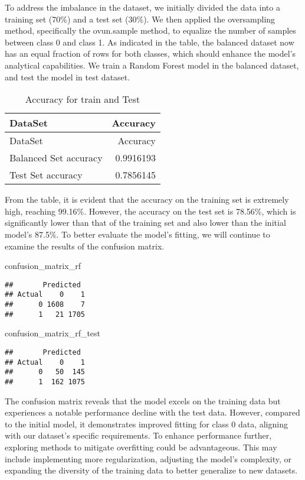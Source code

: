 \documentclass[
]{article}
\newenvironment{Shaded}{\begin{snugshade}}{\end{snugshade}}
\newcommand{\NormalTok}[1]{#1}
\begin{document}
To address the imbalance in the dataset, we initially divided the data
into a training set (70\%) and a test set (30\%). We then applied the
oversampling method, specifically the ovun.sample method, to equalize
the number of samples between class 0 and class 1. As indicated in the
table, the balanced dataset now has an equal fraction of rows for both
classes, which should enhance the model's analytical capabilities. We
train a Random Forest model in the balanced dataset, and test the model
in test dataset.

\begin{longtable}[]{@{}lr@{}}
\caption{Accuracy for train and Test}\tabularnewline
\toprule\noalign{}
DataSet & Accuracy \\
\midrule\noalign{}
\endfirsthead
\toprule\noalign{}
DataSet & Accuracy \\
\midrule\noalign{}
\endhead
\bottomrule\noalign{}
\endlastfoot
Balanced Set accuracy & 0.9916193 \\
Test Set accuracy & 0.7856145 \\
\end{longtable}

From the table, it is evident that the accuracy on the training set is
extremely high, reaching 99.16\%. However, the accuracy on the test set
is 78.56\%, which is significantly lower than that of the training set
and also lower than the initial model's 87.5\%. To better evaluate the
model's fitting, we will continue to examine the results of the
confusion matrix.

\begin{Shaded}
\begin{Highlighting}[]
\NormalTok{confusion\_matrix\_rf}
\end{Highlighting}
\end{Shaded}

\begin{verbatim}
##       Predicted
## Actual    0    1
##      0 1608    7
##      1   21 1705
\end{verbatim}

\begin{Shaded}
\begin{Highlighting}[]
\NormalTok{confusion\_matrix\_rf\_test}
\end{Highlighting}
\end{Shaded}

\begin{verbatim}
##       Predicted
## Actual    0    1
##      0   50  145
##      1  162 1075
\end{verbatim}

The confusion matrix reveals that the model excels on the training data
but experiences a notable performance decline with the test data.
However, compared to the initial model, it demonstrates improved fitting
for class 0 data, aligning with our dataset's specific requirements. To
enhance performance further, exploring methods to mitigate overfitting
could be advantageous. This may include implementing more
regularization, adjusting the model's complexity, or expanding the
diversity of the training data to better generalize to new datasets.
\end{document}
